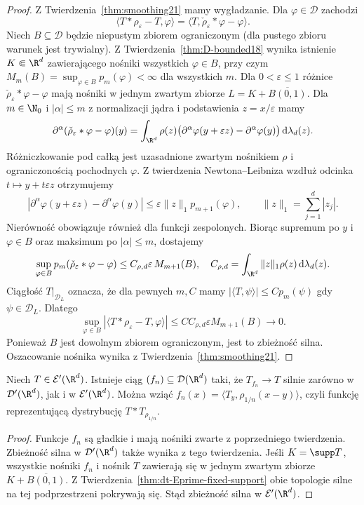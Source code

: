 \begin{proof}
Z Twierdzenia~\ref{thm:smoothing21} mamy wygładzanie.
Dla $\varphi\in\mathcal D$ zachodzi
\[
 \langle T*\rho_\varepsilon-T,\varphi\rangle
 =\langle T,\check\rho_\varepsilon*\varphi-\varphi\rangle.
\]
Niech $B\subseteq\mathcal D$ będzie niepustym zbiorem
ograniczonym (dla pustego zbioru warunek jest trywialny).
Z Twierdzenia~\ref{thm:D-bounded18}
wynika istnienie $K\Subset\R^d$ zawierającego nośniki
wszystkich $\varphi\in B$, przy czym
$M_m(B)=\sup_{\varphi\in B}p_m(\varphi)<\infty$
dla wszystkich $m$. Dla $0<\varepsilon\le1$
różnice $\check\rho_\varepsilon*\varphi-\varphi$
mają nośniki w jednym zwartym zbiorze
$L=K+\overline{B(0,1)}$. Dla $m\in\N_0$ i $|\alpha|\le m$ z normalizacji jądra
i podstawienia $z=x/\varepsilon$ mamy
\[
\begin{aligned}
 \partial^\alpha(\check\rho_\varepsilon*\varphi-\varphi)(y)
 =\int_{\R^d}\rho(z)
 \bigl(\partial^\alpha\varphi(y+\varepsilon z)
 -\partial^\alpha\varphi(y)\bigr)\,\mathrm d\lambda_d(z).
\end{aligned}
\]
Różniczkowanie pod całką jest uzasadnione zwartym
nośnikiem $\rho$ i ograniczonością pochodnych $\varphi$.
Z twierdzenia Newtona--Leibniza wzdłuż odcinka
$t\mapsto y+t\varepsilon z$ otrzymujemy
\[
 |\partial^\alpha\varphi(y+\varepsilon z)
 -\partial^\alpha\varphi(y)|
 \le\varepsilon\|z\|_1 p_{m+1}(\varphi),
 \qquad \|z\|_1=\sum_{j=1}^d|z_j|.
\]
Nierówność obowiązuje również dla funkcji zespolonych.
Biorąc supremum po $y$ i $\varphi\in B$ oraz maksimum
po $|\alpha|\le m$, dostajemy
\[
 \sup_{\varphi\in B}p_m(\check\rho_\varepsilon*\varphi
 -\varphi)
 \le C_{\rho,d}\varepsilon\,M_{m+1}(B),
 \quad
 C_{\rho,d}=\int_{\R^d}\|z\|_1\rho(z)\,\mathrm d\lambda_d(z).
\]
Ciągłość $T|_{\mathcal D_L}$ oznacza, że dla pewnych
$m,C$ mamy $|\langle T,\psi\rangle|\le Cp_m(\psi)$
gdy $\psi\in\mathcal D_L$. Dlatego
\[
 \sup_{\varphi\in B}|\langle T*\rho_\varepsilon-T,
 \varphi\rangle|
 \le CC_{\rho,d}\varepsilon M_{m+1}(B)\longrightarrow0.
\]
Ponieważ $B$ jest dowolnym zbiorem ograniczonym,
jest to zbieżność silna. Oszacowanie nośnika wynika
z Twierdzenia~\ref{thm:smoothing21}.
\end{proof}

\begin{wniosek}
\label{cor:dense-test-compact21}
Niech $T\in\mathcal E'(\R^d)$. Istnieje ciąg
$(f_n)\subseteq\mathcal D(\R^d)$ taki, że
$T_{f_n}\to T$ silnie zarówno w $\mathcal D'(\R^d)$,
jak i w $\mathcal E'(\R^d)$.
Można wziąć $f_n(x)=\langle T_y,\rho_{1/n}(x-y)\rangle$,
czyli funkcję reprezentującą dystrybucję $T*T_{\rho_{1/n}}$.
\end{wniosek}
\begin{proof}
Funkcje $f_n$ są gładkie i mają nośniki zwarte
z poprzedniego twierdzenia. Zbieżność silna w $\mathcal D'(\R^d)$ także
wynika z tego twierdzenia.
Jeśli $K=\supp T$, wszystkie nośniki $f_n$ i nośnik $T$
zawierają się w jednym zwartym zbiorze
$K+\overline{B(0,1)}$. Z Twierdzenia~\ref{thm:dt-Eprime-fixed-support}
obie topologie silne na tej podprzestrzeni pokrywają się.
Stąd zbieżność silna w $\mathcal E'(\R^d)$.
\end{proof}

